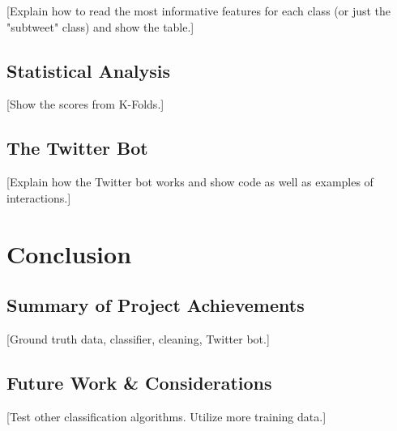 \documentclass[11pt, twoside, reqno]{book}
\begin{document}
[Explain how to read the most informative features for each class (or just the "subtweet" class) and show the table.]

\section{Statistical Analysis}
\label{statistical_analysis}

[Show the scores from K-Folds.]

\section{The Twitter Bot}
\label{the_twitter_bot}

[Explain how the Twitter bot works and show code as well as examples of interactions.]

\chapter{Conclusion}
\label{conclusion}

\section{Summary of Project Achievements}
\label{summary}

[Ground truth data, classifier, cleaning, Twitter bot.]

\section{Future Work \& Considerations}
\label{future_work_and_considerations}

[Test other classification algorithms. Utilize more training data.]
\end{document}
